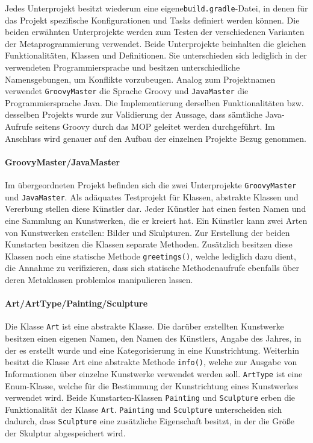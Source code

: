 Jedes Unterprojekt besitzt wiederum eine eigene\texttt{build.gradle}-Datei, in denen für das Projekt spezifische Konfigurationen und Tasks definiert werden können. 
Die beiden erwähnten Unterprojekte werden zum Testen der verschiedenen Varianten der Metaprogrammierung verwendet.
Beide Unterprojekte beinhalten die gleichen Funktionalitäten, Klassen und Definitionen. 
Sie unterschieden sich lediglich in der verwendeten Programmiersprache und besitzen unterschiedliche Namensgebungen, um Konflikte vorzubeugen.
Analog zum Projektnamen verwendet \texttt{GroovyMaster} die Sprache Groovy und \texttt{JavaMaster} die Programmiersprache Java. 
Die Implementierung derselben Funktionalitäten bzw. desselben Projekts wurde zur Validierung der Aussage, dass sämtliche Java-Aufrufe seitens Groovy durch das MOP geleitet werden durchgeführt.
Im Anschluss wird genauer auf den Aufbau der einzelnen Projekte Bezug genommen.


\paragraph{GroovyMaster/JavaMaster}
Im übergeordneten Projekt befinden sich die zwei Unterprojekte \texttt{GroovyMaster} und \texttt{JavaMaster}. 
Als adäquates Testprojekt für Klassen, abstrakte Klassen und Vererbung stellen diese Künstler dar.
Jeder Künstler hat einen festen Namen und eine Sammlung an Kunstwerken, die er kreiert hat.
Ein Künstler kann zwei Arten von Kunstwerken erstellen: Bilder und Skulpturen. 
Zur Erstellung der beiden Kunstarten besitzen die Klassen separate Methoden. 
Zusätzlich besitzen diese Klassen noch eine statische Methode \texttt{greetings()}, welche lediglich dazu dient, die Annahme zu verifizieren, dass sich statische Methodenaufrufe ebenfalls über deren Metaklassen problemlos manipulieren lassen.


\paragraph{Art/ArtType/Painting/Sculpture}
Die Klasse \texttt{Art} ist eine abstrakte Klasse. 
Die darüber erstellten Kunstwerke besitzen einen eigenen Namen, den Namen des Künstlers, Angabe des Jahres, in der es erstellt wurde und eine Kategorisierung in eine Kunstrichtung. 
Weiterhin besitzt die Klasse {Art} eine abstrakte Methode \texttt{info()}, welche zur Ausgabe von Informationen über einzelne Kunstwerke verwendet werden soll.
\texttt{ArtType} ist eine Enum-Klasse, welche für die Bestimmung der Kunstrichtung eines Kunstwerkes verwendet wird. 
Beide Kunstarten-Klassen \texttt{Painting} und \texttt{Sculpture} erben die Funktionalität der Klasse \texttt{Art}. 
\texttt{Painting} und \texttt{Sculpture} unterscheiden sich dadurch, dass \texttt{Sculpture} eine zusätzliche Eigenschaft besitzt, in der die Größe der Skulptur abgespeichert wird. 

